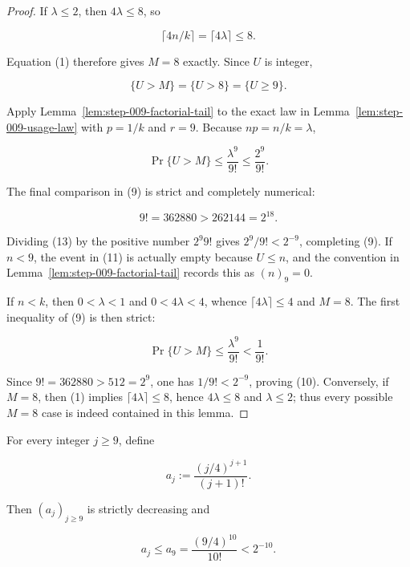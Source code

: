 \begin{proof}
If \(\lambda\le2\), then \(4\lambda\le8\), so

\[
\lceil4n/k\rceil=\lceil4\lambda\rceil\le8.
\]

Equation (1) therefore gives \(M=8\) exactly. Since \(U\) is integer,

\[
\{U>M\}=\{U>8\}=\{U\ge9\}.
\tag{11}
\]

Apply Lemma~\ref{lem:step-009-factorial-tail} to the exact law in
Lemma~\ref{lem:step-009-usage-law} with \(p=1/k\) and \(r=9\). Because
\(np=n/k=\lambda\),

\[
\Pr\{U>M\}\le\frac{\lambda^9}{9!}
\le\frac{2^9}{9!}.
\tag{12}
\]

The final comparison in (9) is strict and completely numerical:

\[
9!=362880>262144=2^{18}.
\tag{13}
\]

Dividing (13) by the positive number \(2^9 9!\) gives
\(2^9/9!<2^{-9}\), completing (9). If \(n<9\), the event in (11) is
actually empty because \(U\le n\), and the convention in
Lemma~\ref{lem:step-009-factorial-tail} records this as \((n)_9=0\).

If \(n<k\), then \(0<\lambda<1\) and
\(0<4\lambda<4\), whence \(\lceil4\lambda\rceil\le4\) and \(M=8\).
The first inequality of (9) is then strict:

\[
\Pr\{U>M\}\le\frac{\lambda^9}{9!}<\frac1{9!}.
\]

Since \(9!=362880>512=2^9\), one has \(1/9!<2^{-9}\), proving (10).
Conversely, if \(M=8\), then (1) implies
\(\lceil4\lambda\rceil\le8\), hence \(4\lambda\le8\) and
\(\lambda\le2\); thus every possible \(M=8\) case is indeed contained
in this lemma. \end{proof}

\begin{lemma}\label{lem:step-009-envelope}
For every integer \(j\ge9\), define

\[
a_j:=\frac{(j/4)^{j+1}}{(j+1)!}.
\tag{14}
\]

Then \((a_j)_{j\ge9}\) is strictly decreasing and

\[
a_j\le a_9
=\frac{(9/4)^{10}}{10!}
<2^{-10}.
\tag{15}
\]
\end{lemma}

